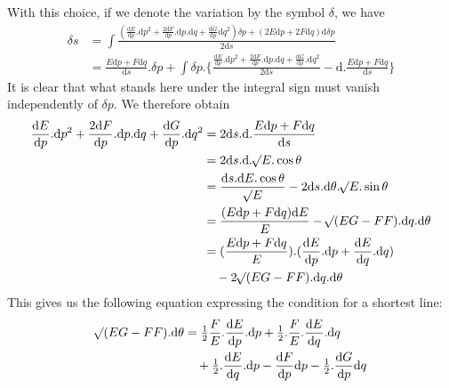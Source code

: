 %
With this choice, if we denote the variation by the symbol \(\delta\), we have
\[
\begin{aligned}
\delta s&=\int\frac{(\tfrac{\mathrm{d}E}{\mathrm{d}p}\mathord{.}\mathrm{d}p^2+\tfrac{2\mathrm{d}F}{\mathrm{d}p}\mathord{.}\mathrm{d}p\mathord{.}\mathrm{d}q+\tfrac{\mathrm{d}G}{\mathrm{d}p}\mathrm{d}q^2)\delta p+(2E\mathrm{d}p+2F\mathrm{d}q)\mathrm{d}\delta p}{2\mathrm{d}s}\\
&=\frac{E\mathrm{d}p+F\mathrm{d}q}{\mathrm{d}s}\mathord{.}\delta p+\int\delta p\mathord{.}\{\frac{\tfrac{\mathrm{d}E}{\mathrm{d}p}\mathord{.}\mathrm{d}p^2+\tfrac{2\mathrm{d}F}{\mathrm{d}p}\mathord{.}\mathrm{d}p\mathord{.}\mathrm{d}q+\tfrac{\mathrm{d}G}{\mathrm{d}p}\mathord{.}\mathrm{d}q^2}{2\mathrm{d}s}-\mathrm{d}\mathord{.}\frac{E\mathrm{d}p+F\mathrm{d}q}{\mathrm{d}s}\}
\end{aligned}
\]
It is clear that what stands here under the integral sign must vanish independently of \(\delta p\). We therefore obtain
\[
\begin{aligned}
\frac{\mathrm{d}E}{\mathrm{d}p}\mathord{.}\mathrm{d}p^2+\frac{2\mathrm{d}F}{\mathrm{d}p}\mathord{.}\mathrm{d}p\mathord{.}\mathrm{d}q+\frac{\mathrm{d}G}{\mathrm{d}p}\mathord{.}\mathrm{d}q^2&=2\mathrm{d}s\mathord{.}\mathrm{d}\mathord{.}\frac{E\mathrm{d}p+F\mathrm{d}q}{\mathrm{d}s}\\
&=2\mathrm{d}s\mathord{.}\mathrm{d}\mathord{.}\mathord{{}^{}\!\surd}E\mathord{.}\cos\theta\\
&=\frac{\mathrm{d}s\mathord{.}\mathrm{d}E\mathord{.}\cos\theta}{\mathord{{}^{}\!\surd}E}-2\mathrm{d}s\mathord{.}\mathrm{d}\theta\mathord{.}\mathord{{}^{}\!\surd}E\mathord{.}\sin\theta\\
&=\frac{(E\mathrm{d}p+F\mathrm{d}q)\mathrm{d}E}{E}-\mathord{{}^{}\!\surd}(EG-FF)\mathord{.}\mathrm{d}q\mathord{.}\mathrm{d}\theta\\
&=(\frac{E\mathrm{d}p+F\mathrm{d}q}{E})\mathord{.}(\frac{\mathrm{d}E}{\mathrm{d}p}\mathord{.}\mathrm{d}p+\frac{\mathrm{d}E}{\mathrm{d}q}\mathord{.}\mathrm{d}q)\\
&\quad-2\mathord{{}^{}\!\surd}(EG-FF)\mathord{.}\mathrm{d}q\mathord{.}\mathrm{d}\theta
\end{aligned}
\]
This gives us the following equation expressing the condition for a shortest line:
\[
\begin{aligned}
\mathord{{}^{}\!\surd}(EG-FF)\mathord{.}\mathrm{d}\theta
&=\tfrac{1}{2}\frac{F}{E}\mathord{.}\frac{\mathrm{d}E}{\mathrm{d}p}\mathord{.}\mathrm{d}p+\tfrac{1}{2}\mathord{.}\frac{F}{E}\mathord{.}\frac{\mathrm{d}E}{\mathrm{d}q}\mathord{.}\mathrm{d}q\\
&\quad+\tfrac{1}{2}\mathord{.}\frac{\mathrm{d}E}{\mathrm{d}q}\mathord{.}\mathrm{d}p-\frac{\mathrm{d}F}{\mathrm{d}p}\mathrm{d}p-\tfrac{1}{2}\mathord{.}\frac{\mathrm{d}G}{\mathrm{d}p}\mathrm{d}q
\end{aligned}
\]
